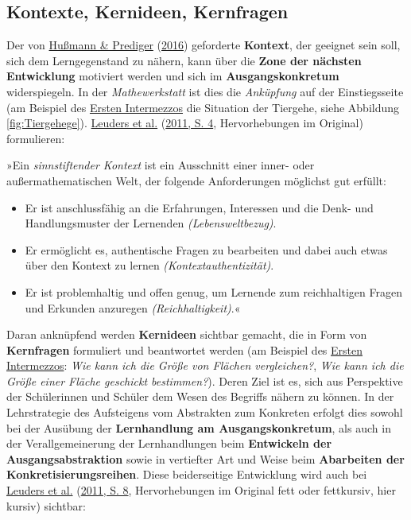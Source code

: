 \documentclass[
  ngerman,
]{scrbook}
\providecommand{\tightlist}{%
  \setlength{\itemsep}{0pt}\setlength{\parskip}{0pt}}
\theoremstyle{definition}
\theoremstyle{definition}
\theoremstyle{definition}
\theoremstyle{definition}
\theoremstyle{remark}
\begin{document}
\hypertarget{kontexte-kernideen-kernfragen}{%
\subsection{Kontexte, Kernideen, Kernfragen}\label{kontexte-kernideen-kernfragen}}

Der von \protect\hyperlink{ref-Hussmann:2016}{Hußmann \& Prediger} (\protect\hyperlink{ref-Hussmann:2016}{2016}) geforderte \textbf{Kontext}, der geeignet sein soll, sich dem Lerngegenstand zu nähern, kann über die \textbf{Zone der nächsten Entwicklung} motiviert werden und sich im \textbf{Ausgangskonkretum} widerspiegeln. In der \emph{Mathewerkstatt} ist dies die \emph{Anküpfung} auf der Einstiegsseite (am Beispiel des \protect\hyperlink{erstes-intermezzo-flaecheninhalt}{Ersten Intermezzos} die Situation der Tiergehe, siehe Abbildung \ref{fig:Tiergehege}). \protect\hyperlink{ref-Leuders2011}{Leuders et al.} (\protect\hyperlink{ref-Leuders2011}{2011, S. 4}, Hervorhebungen im Original) formulieren:

»Ein \emph{sinnstiftender Kontext} ist ein Ausschnitt einer inner- oder außermathematischen Welt, der folgende Anforderungen möglichst gut erfüllt:

\begin{itemize}
\tightlist
\item
  Er ist anschlussfähig an die Erfahrungen, Interessen und die Denk- und Handlungsmuster der Lernenden \emph{(Lebensweltbezug)}.
\item
  Er ermöglicht es, authentische Fragen zu bearbeiten und dabei auch etwas über den Kontext zu lernen \emph{(Kontextauthentizität)}.
\item
  Er ist problemhaltig und offen genug, um Lernende zum reichhaltigen Fragen und Erkunden anzuregen \emph{(Reichhaltigkeit)}.«
\end{itemize}

Daran anknüpfend werden \textbf{Kernideen} sichtbar gemacht, die in Form von \textbf{Kernfragen} formuliert und beantwortet werden (am Beispiel des \protect\hyperlink{erstes-intermezzo-flaecheninhalt}{Ersten Intermezzos}: \emph{Wie kann ich die Größe von Flächen vergleichen?}, \emph{Wie kann ich die Größe einer Fläche geschickt bestimmen?}). Deren Ziel ist es, sich aus Perspektive der Schülerinnen und Schüler dem Wesen des Begriffs nähern zu können. In der Lehrstrategie des Aufsteigens vom Abstrakten zum Konkreten erfolgt dies sowohl bei der Ausübung der \textbf{Lernhandlung am Ausgangskonkretum}, als auch in der Verallgemeinerung der Lernhandlungen beim \textbf{Entwickeln der Ausgangsabstraktion} sowie in vertiefter Art und Weise beim \textbf{Abarbeiten der Konkretisierungsreihen}. Diese beiderseitige Entwicklung wird auch bei \protect\hyperlink{ref-Leuders2011}{Leuders et al.} (\protect\hyperlink{ref-Leuders2011}{2011, S. 8}, Hervorhebungen im Original fett oder fettkursiv, hier kursiv) sichtbar:
\end{document}
